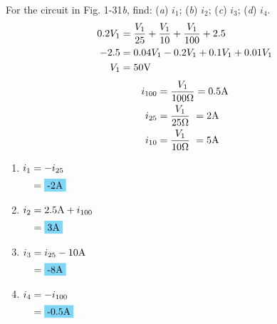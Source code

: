 For the circuit in Fig. 1-31\emph{b}, find: (\emph{a}) $i_1$; (\emph{b}) $i_2$; (\emph{c}) $i_3$; (\emph{d}) $i_4$.
\begin{align*}
	0.2V_1 &= \frac{V_1}{25}+\frac{V_1}{10}+\frac{V_1}{100}+2.5 \\
	-2.5 &= 0.04V_1-0.2V_1+0.1V_1+0.01V_1 \\
	V_1&=50\qw{\V}	
\end{align*}
\begin{align*}
	i_{100} &= \frac{V_1}{100\qw{\ohm}} = 0.5\qw{\A} \\
	i_{25} &= \frac{V_1}{25\qw{\ohm}} \ = 2\qw{\A} \\
	i_{10} &= \frac{V_1}{10\qw{\ohm}} \ = 5\qw{\A} \\
\end{align*}
\begin{enumerate}[leftmargin=2cm,labelsep=.5cm,label=\bfseries\alph*)]
	\item $
	\begin{aligned}[t]
	i_1 &= -i_{25} \\
	&= \hlbox{-2\qw{\A}}
	\end{aligned} $
	\\[1cm]
	
	\item $
	\begin{aligned}[t]
	i_2 &= 2.5\qw{\A}+i_{100} \\
	&= \hlbox{3\qw{\A}}
	\end{aligned} $
	\\[1cm]
	
	\item $
	\begin{aligned}[t]
	i_3 &= i_{25}-10\qw{\A} \\
	&= \hlbox{-8\qw{\A}}
	\end{aligned} $
	\\[1cm]
	
	\item $
	\begin{aligned}[t]
	i_4 &= -i_{100} \\
	&= \hlbox{-0.5\qw{\A}}
	\end{aligned} $
	\\[1cm]
\end{enumerate}
